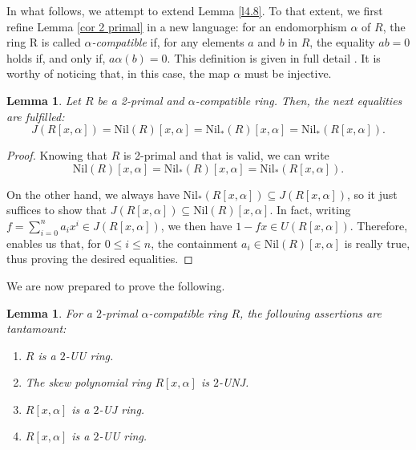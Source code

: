 \documentclass[12pt]{amsart}
\newtheorem{lemma}[theorem]{Lemma}
\theoremstyle{definition}
\begin{document}
In what follows, we attempt to extend Lemma \ref{l4.8}. To that extent, we first refine Lemma \ref{cor 2 primal} in a new language: for an endomorphism $\alpha$ of $R$, the ring R is called {\it $\alpha$-compatible} if, for any elements $a$ and $b$ in $R$, the equality $ab = 0$ holds if, and only if, $a\alpha(b) = 0$. This definition is given in full detail \cite{has}. It is worthy of noticing that, in this case, the map $\alpha$ must be injective.

\begin{lemma}
Let $R$ be a 2-primal and $\alpha$-compatible ring. Then, the next equalities are fulfilled:
\[ J(R[x,\alpha]) = \text{Nil}(R)[x,\alpha] = \text{Nil}_*(R)[x,\alpha] = \text{Nil}_*(R[x,\alpha]). \]
\end{lemma}

\begin{proof}
Knowing that $R$ is 2-primal and that \cite[Lemma 2.2]{ccp} is valid, we can write $$\text{Nil}(R)[x,\alpha] = \text{Nil}_*(R)[x,\alpha] = \text{Nil}_*(R[x,\alpha]).$$

On the other hand, we always have $\text{Nil}_*(R[x,\alpha]) \subseteq J(R[x,\alpha])$, so it just suffices to show that $J(R[x,\alpha]) \subseteq \text{Nil}(R)[x,\alpha]$. In fact, writing $f = \sum_{i=0}^{n}a_ix^i \in J(R[x,\alpha])$, we then have $1-fx \in U(R[x,\alpha])$. Therefore, \cite[Lemma 2.2]{ccp} enables us that, for $0\leq i\leq n$, the containment $a_i \in \text{Nil}(R)[x,\alpha]$ is really true, thus proving the desired equalities.
\end{proof}

We are now prepared to prove the following.

\begin{lemma}\label{lemma alpha}
For a $2$-primal $\alpha$-compatible ring $R$, the following assertions are tantamount:
\begin{enumerate}
\item $R$ is a $2$-UU ring.
\item The skew polynomial ring $R[x,\alpha]$ is $2$-UNJ.
\item $R[x,\alpha]$ is a $2$-UJ ring.
\item $R[x,\alpha]$ is a $2$-UU ring.
\end{enumerate}
\end{lemma}
\end{document}
